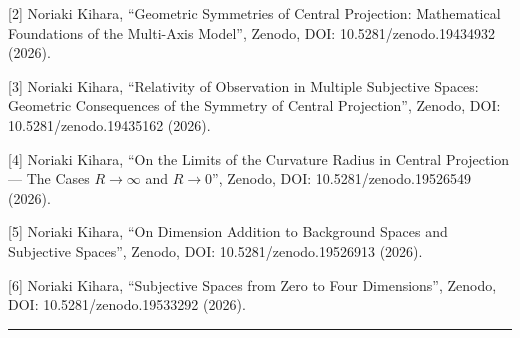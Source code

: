 \documentclass[a4paper,11pt]{article}
\theoremstyle{definition}
\begin{document}
{[}2{]} Noriaki Kihara, ``Geometric Symmetries of Central Projection: Mathematical Foundations of the Multi-Axis Model'', Zenodo, DOI: 10.5281/zenodo.19434932 (2026).

{[}3{]} Noriaki Kihara, ``Relativity of Observation in Multiple Subjective Spaces: Geometric Consequences of the Symmetry of Central Projection'', Zenodo, DOI: 10.5281/zenodo.19435162 (2026).

{[}4{]} Noriaki Kihara, ``On the Limits of the Curvature Radius in Central Projection --- The Cases \(R \to \infty\) and \(R \to 0\)'', Zenodo, DOI: 10.5281/zenodo.19526549 (2026).

{[}5{]} Noriaki Kihara, ``On Dimension Addition to Background Spaces and Subjective Spaces'', Zenodo, DOI: 10.5281/zenodo.19526913 (2026).

{[}6{]} Noriaki Kihara, ``Subjective Spaces from Zero to Four Dimensions'', Zenodo, DOI: 10.5281/zenodo.19533292 (2026).

\begin{center}\rule{0.5\linewidth}{0.5pt}\end{center}
\end{document}
